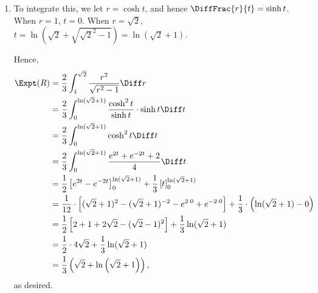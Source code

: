 \begin{enumerate}
    \item To integrate this, we let \(r = \cosh t\), and hence \(\DiffFrac{r}{t} = \sinh t\). When \(r = 1\), \(t = 0\). When \(r = \sqrt{2}\), \(t = \ln \left(\sqrt{2} + \sqrt{\sqrt{2}^2 - 1}\right) = \ln (\sqrt{2} + 1)\).

          Hence,
          \begin{align*}
              \Expt(R) & = \frac{2}{3} \int_{1}^{\sqrt{2}} \frac{r^2}{\sqrt{r^2 - 1}} \Diff r                                                                                              \\
                       & = \frac{2}{3} \int_{0}^{\ln (\sqrt{2} + 1)} \frac{\cosh^2 t}{\sinh t} \cdot \sinh t \Diff t                                                                       \\
                       & = \frac{2}{3} \int_{0}^{\ln (\sqrt{2} + 1)} \cosh^2 t \Diff t                                                                                                     \\
                       & = \frac{2}{3} \int_{0}^{\ln (\sqrt{2} + 1)} \frac{e^{2t} + e^{-2t} + 2}{4} \Diff t                                                                                \\
                       & = \frac{1}{2} \left[e^{2t} - e^{-2t}\right]_{0}^{\ln (\sqrt{2} + 1)} + \frac{1}{3} \left[t\right]_{0}^{\ln(\sqrt{2} + 1)}                                         \\
                       & = \frac{1}{12} \cdot \left[(\sqrt{2} + 1)^2 - (\sqrt{2} + 1)^{-2} - e^{2 \cdot 0} + e^{-2 \cdot 0}\right] + \frac{1}{3} \cdot \left(\ln (\sqrt{2} + 1) - 0\right) \\
                       & = \frac{1}{2} \left[2 + 1 + 2\sqrt{2} - (\sqrt{2} - 1)^2\right] + \frac{1}{3} \ln (\sqrt{2} + 1)                                                                  \\
                       & = \frac{1}{2} \cdot 4 \sqrt{2} + \frac{1}{3} \ln (\sqrt{2} + 1)                                                                                                   \\
                       & = \frac{1}{3} \left(\sqrt{2} + \ln \left(\sqrt{2} + 1\right)\right),
          \end{align*}
          as desired.
\end{enumerate}